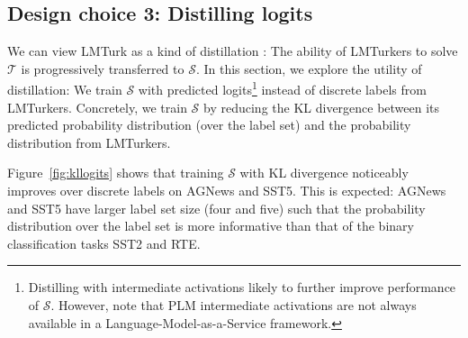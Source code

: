 \documentclass[11pt]{article}
\def\md{LMTurk\xspace}
\def\mdrs{LMTurkers\xspace}
\def\figref#1{Figure~\ref{fig:#1}}
\begin{document}
\subsection{Design choice 3: Distilling logits}
We can view \md as a kind of distillation \citep{hinton2015distilling}:
The ability of
\mdrs to solve $\mathcal{T}$ is progressively transferred 
to $\mathcal{S}$.
In this section, we explore 
the utility of distillation:
We train
$\mathcal{S}$
with predicted logits\footnote{
Distilling with intermediate activations likely
to further improve performance of $\mathcal{S}$.
However, note that PLM intermediate activations
are not always available in a
Language-Model-as-a-Service framework.
}
instead of discrete labels
from \mdrs.
Concretely, we 
train
$\mathcal{S}$ by reducing the
KL divergence between its
predicted probability distribution
(over the label set)
and the
probability distribution
from \mdrs.

\figref{kllogits} shows that
training
$\mathcal{S}$ with KL divergence
noticeably improves
over discrete labels
on AGNews and SST5.
This is expected:
AGNews and SST5 have larger
label set size (four and five)
such that the
probability distribution over the label set
is more informative than
that of
the binary classification tasks
SST2 and RTE.
\end{document}
